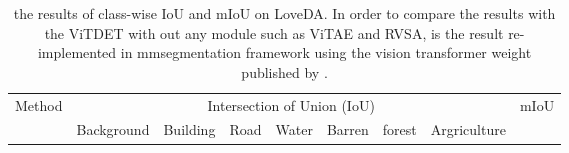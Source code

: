 \begin{table*}[t]{\textwidth=0mm}
{\begin{tabular}{l|c c c c c | c | c}
    \end{tabular}
    }
    \label{tab:potsdam table}
\end{table*} \begin{table*}[t]{\textwidth=0mm}
    \centering
    \caption{the results of class-wise IoU and mIoU on LoveDA. In order to compare the results with the ViTDET with out any module such as ViTAE and RVSA,  is the result re-implemented in mmsegmentation framework using the vision transformer weight published by \cite{wang2022advancing}.}
    \renewcommand{\arraystretch}{1.0}
    {
    \begin{tabular}{l|c c c c c c c | c}
    
        \hline
       
       
       \multirow{2}{*}{Method} & \multicolumn{7}{c|}{Intersection of Union (IoU)} & \multirow{2}{*}{mIoU} \\ \cline{2-8}
        & Background & Building & Road & Water & Barren & forest & Argriculture &  \\ \hline


\end{tabular}}
\end{table*}
